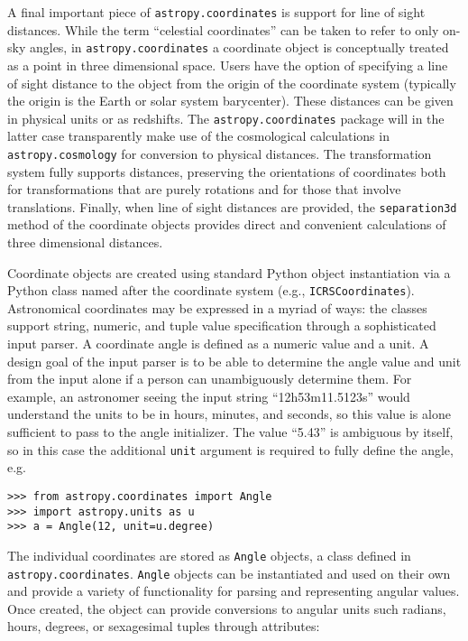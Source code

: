 \documentclass[traditabstract]{aa}
\begin{document}
A final important piece of \texttt{astropy.coordinates} is support for
line of sight distances. While the term ``celestial coordinates'' can be
taken to refer to only on-sky angles, in \texttt{astropy.coordinates} a
coordinate object is conceptually treated as a point in three dimensional space.
Users have the option of specifying a line of sight distance to the
object from the origin of the coordinate system (typically the origin is the
Earth or solar system barycenter). These distances can be given in physical
units or as redshifts. The \texttt{astropy.coordinates} package will in the
latter case transparently make use of the cosmological calculations in \texttt{astropy.cosmology} for
conversion to physical distances.
The transformation system fully supports distances, preserving
the orientations of coordinates both for transformations that are purely
rotations and for those that involve translations.  Finally, when
line of sight distances are provided, the \texttt{separation3d} method of the
coordinate objects provides direct and convenient calculations of
three dimensional distances.


Coordinate objects are created using standard
Python object instantiation via a Python class named 
after the coordinate system (e.g., \texttt{ICRSCoordinates}). 
Astronomical coordinates may be expressed in a myriad
of ways: the classes support string, numeric, and tuple value
specification through a sophisticated input parser.
A coordinate angle is defined as a numeric value and a unit.
A design goal of the input parser is to be able to determine the
angle value and unit from the input alone if a person can
unambiguously determine them.
For example, an astronomer seeing the input string ``12h53m11.5123s''
would understand the units to be in hours, minutes, and seconds, so this
value is alone sufficient to pass to the angle initializer. The value ``5.43'' is
ambiguous by itself, so in this case the additional \texttt{unit} argument is required to
fully define the angle, e.g.

\begin{verbatim}
>>> from astropy.coordinates import Angle
>>> import astropy.units as u
>>> a = Angle(12, unit=u.degree)
\end{verbatim}

The individual coordinates are stored as \texttt{Angle}
objects, a class defined in \texttt{astropy.coordinates}.
\texttt{Angle} objects can be instantiated and used on their
own and provide a variety of functionality for parsing and representing
angular values. Once created, the object can provide conversions to angular units
such radians, hours, degrees, or sexagesimal tuples through attributes:
\end{document}
